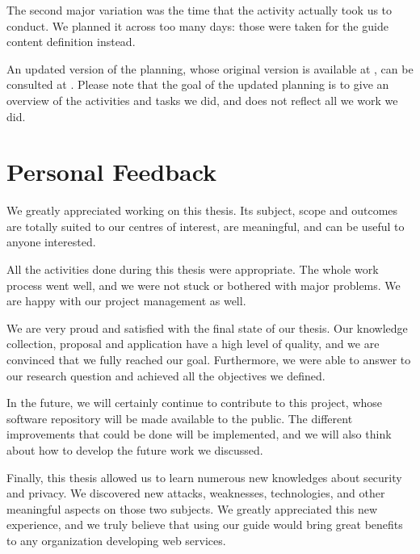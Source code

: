 The second major variation was the time that the  activity actually took us to conduct. We planned it across too many days: those were taken for the guide content definition instead.

An updated version of the planning, whose original version is available at , can be consulted at . Please note that the goal of the updated planning is to give an overview of the activities and tasks we did, and does not reflect all we work we did.

\section{Personal Feedback}
\label{sec:conclusions_personal}

We greatly appreciated working on this thesis. Its subject, scope and outcomes are totally suited to our centres of interest, are meaningful, and can be useful to anyone interested.

All the activities done during this thesis were appropriate. The whole work process went well, and we were not stuck or bothered with major problems. We are happy with our project management as well.

We are very proud and satisfied with the final state of our thesis. Our knowledge collection, proposal and application have a high level of quality, and we are convinced that we fully reached our goal. Furthermore, we were able to answer to our research question and achieved all the objectives we defined.

In the future, we will certainly continue to contribute to this project, whose software repository will be made available to the public. The different improvements that could be done will be implemented, and we will also think about how to develop the future work we discussed.

Finally, this thesis allowed us to learn numerous new knowledges about security and privacy. We discovered new attacks, weaknesses, technologies, and other meaningful aspects on those two subjects. We greatly appreciated this new experience, and we truly believe that using our guide would bring great benefits to any organization developing web services.